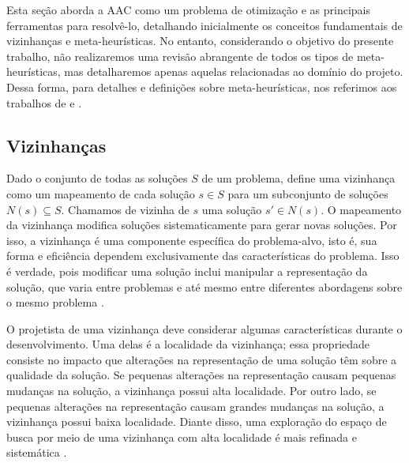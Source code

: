 Esta seção aborda a \ac{AAC} como um problema de otimização e as principais ferramentas para resolvê-lo, detalhando inicialmente os conceitos fundamentais de vizinhanças e meta-heurísticas. No entanto, considerando o objetivo do presente trabalho, não realizaremos uma revisão abrangente de todos os tipos de meta-heurísticas, mas detalharemos apenas aquelas relacionadas ao domínio do projeto. Dessa forma, para detalhes e definições sobre meta-heurísticas, nos referimos aos trabalhos de \cite{talbi} e \cite{zbb}.


\subsection{Vizinhanças}

Dado o conjunto de todas as soluções $S$ de um problema, \cite{talbi} define uma vizinhança como um mapeamento de cada solução $s \in S$ para um subconjunto de soluções $N(s) \subseteq S$. Chamamos de vizinha de $s$ uma solução $s' \in N(s)$. O mapeamento da vizinhança modifica soluções sistematicamente para gerar novas soluções. Por isso, a vizinhança é uma componente específica do problema-alvo, isto é, sua forma e eficiência dependem exclusivamente das características do problema. Isso é verdade, pois modificar uma solução inclui manipular a representação da solução, que varia entre problemas e até mesmo entre diferentes abordagens sobre o mesmo problema \citep{talbi}.

O projetista de uma vizinhança deve considerar algumas características durante o desenvolvimento. Uma delas é a localidade da vizinhança; essa propriedade consiste no impacto que alterações na representação de uma solução têm sobre a qualidade da solução. Se pequenas alterações na representação causam pequenas mudanças na solução, a vizinhança possui alta localidade. Por outro lado, se pequenas alterações na representação causam grandes mudanças na solução, a vizinhança possui baixa localidade. Diante disso, uma exploração do espaço de busca por meio de uma vizinhança com alta localidade é mais refinada e sistemática \citep{talbi}.

